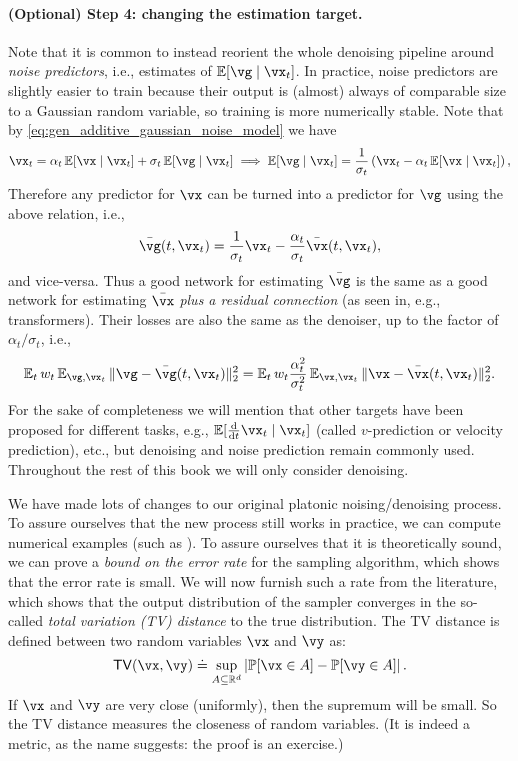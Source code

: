 \documentclass[../../book-main.tex]{subfiles}
\begin{document}
\paragraph{(Optional) Step 4: changing the estimation target.} Note that it is common to instead reorient the whole denoising pipeline around \textit{noise predictors}, i.e., estimates of \(\Ex[\vg \mid \vx_{t}]\). In practice, noise predictors are slightly easier to train because their output is (almost) always of comparable size to a Gaussian random variable, so training is more numerically stable. Note that by \eqref{eq:gen_additive_gaussian_noise_model} we have 
\begin{equation}
	\vx_{t} = \alpha_{t}\Ex[\vx \mid \vx_{t}] + \sigma_{t}\Ex[\vg \mid \vx_{t}] \implies \Ex[\vg \mid \vx_{t}] = \frac{1}{\sigma_{t}}\bp{\vx_{t} - \alpha_{t}\Ex[\vx \mid \vx_{t}]},
\end{equation}
Therefore any predictor for \(\vx\) can be turned into a predictor for \(\vg\) using the above relation, i.e.,
\begin{equation}
	\bar{\vg}(t, \vx_{t}) = \frac{1}{\sigma_{t}}\vx_{t} - \frac{\alpha_{t}}{\sigma_{t}}\bar{\vx}(t, \vx_{t}),
\end{equation}
and vice-versa. Thus a good network for estimating \(\bar{\vg}\) is the same as a good network for estimating \(\bar{\vx}\) \textit{plus a residual connection} (as seen in, e.g., transformers). Their losses are also the same as the denoiser, up to the factor of \(\alpha_{t}/\sigma_{t}\), i.e.,
\begin{equation}
	\Ex_{t}w_{t}\Ex_{\vg, \vx_{t}}\norm{\vg - \bar{\vg}(t, \vx_{t})}_{2}^{2} = \Ex_{t}w_{t}\frac{\alpha_{t}^{2}}{\sigma_{t}^{2}}\Ex_{\vx, \vx_{t}}\norm{\vx - \bar{\vx}(t, \vx_{t})}_{2}^{2}.
\end{equation}
For the sake of completeness we will mention that other targets have been proposed for different tasks, e.g., \(\Ex[\odv*{\vx_{t}}{t} \mid \vx_{t}]\) (called \(v\)-prediction or velocity prediction), etc., but denoising and noise prediction remain commonly used. Throughout the rest of this book we will only consider denoising.


We have made lots of changes to our original platonic noising/denoising process. To assure ourselves that the new process still works in practice, we can compute numerical examples (such as ). To assure ourselves that it is theoretically sound, we can prove a \textit{bound on the error rate} for the sampling algorithm, which shows that the error rate is small. We will now furnish such a rate from the literature, which shows that the output distribution of the sampler converges in the so-called \textit{total variation (TV) distance} to the true distribution. The TV distance is defined between two random variables \(\vx\) and \(\vy\) as:
\begin{equation}
	\TV(\vx, \vy) \doteq \sup_{A \subseteq \R^{d}}\abs*{\Pr[\vx \in A] - \Pr[\vy \in A]}.
\end{equation}
If \(\vx\) and \(\vy\) are very close (uniformly), then the supremum will be small. So the TV distance measures the closeness of random variables. (It is indeed a metric, as the name suggests: the proof is an exercise.)
\end{document}
